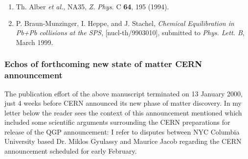 \begin{mdframed}[linecolor=gray,roundcorner=12pt,backgroundcolor=Dandelion!15,linewidth=1pt,leftmargin=0cm,rightmargin=0cm,topline=true,bottomline=true,skipabove=12pt]
{\begin{enumerate}
\item%
Th. Alber {\it et al.}, NA35,
{\it Z. Phys.} C {\bf 64}, 195 (1994).

\item%
P. Braun-Munzinger, I. Heppe, and J. Stachel, {\it Chemical
Equilibration in Pb+Pb collisions at the SPS}, [nucl-th/9903010],
submitted to {\it Phys. Lett. B}, March 1999. 

\end{enumerate}
}
\end{mdframed}
\vskip 0.5cm 

\subsubsection{Echos of forthcoming new state of matter CERN announcement}
The publication effort of the above manuscript terminated  on 13 January 2000, just 4 weeks before CERN announced its new phase of matter discovery. In my letter below the reader sees the context of this announcement mentioned which included some scientific arguments surrounding the CERN preparations for release of the QGP announcement: I refer to disputes between NYC Columbia University based Dr. Miklos Gyulassy and Maurice Jacob regarding the CERN announcement scheduled for early February.\\

